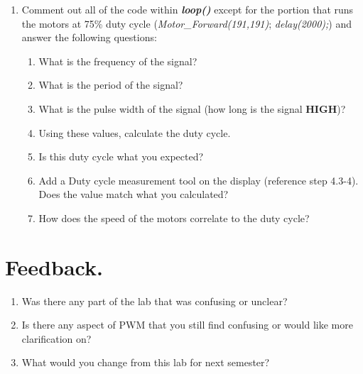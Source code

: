 \documentclass{handout}
\begin{document}
\begin{enumerate}
\item Comment out all of the code within \textbf{\textit{loop()}} except for the portion that runs the motors at 75\% duty cycle (\textit{Motor\_Forward(191,191)}; \textit{delay(2000);}) and answer the following questions:
\begin{enumerate}
	\item What is the frequency of the signal? 
	\item What is the period of the signal? \soln{.3in}{}
	\item What is the pulse width of the signal (how long is the signal \textbf{HIGH})? \soln{.3in}{}
	\item Using these values, calculate the duty cycle. \soln{.3in}{}
	\item Is this duty cycle what you expected? \soln{.3in}{}
	\item Add a Duty cycle measurement tool on the display (reference step 4.3-4). Does the value match what you calculated?\soln{.3in}{}
	\item How does the speed of the motors correlate to the duty cycle? \soln{.3in}{}
	
\end{enumerate}
	\end{enumerate}
\section{Feedback.}
\begin{enumerate}
	\item Was there any part of the lab that was confusing or unclear? \soln{.3in}{}
	\item Is there any aspect of PWM that you still find confusing or would like more clarification on? \soln{.3in}{}
	\item What would you change from this lab for next semester? \soln{.3in}{}
\end{enumerate}
	
\end{document}
